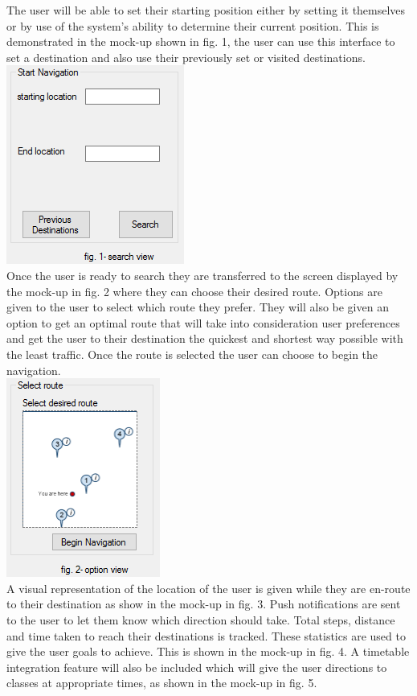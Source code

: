 \documentclass[a4paper,12pt]{article}
\begin{document}
The user will be able to set their starting position either by setting it themselves or by use of the system's ability to determine their current position. This is demonstrated in the mock-up shown in fig. 1, the user can use this interface to set a destination and also use their previously set or visited destinations. \\
\includegraphics[scale=1]{images/user_one.PNG}\\
Once the user is ready to search they are transferred to the screen displayed by the mock-up in fig. 2 where they can choose their desired route. Options are given to the user to select which route they prefer. They will also be given an option to get an optimal route that will  take into consideration user preferences and get the user to their destination the quickest and shortest way possible with the least traffic. Once the route is selected the user can choose to begin the navigation.\\
\includegraphics[scale=1]{images/user_two.PNG}\\
A visual representation of the location of the user is given while they are en-route to their destination as show in the mock-up in fig. 3. Push notifications are sent to the user to let them know which direction should take. Total steps, distance and time taken to reach their destinations is tracked. These statistics are used to give the user goals to achieve. This is shown in the mock-up in fig. 4. A timetable integration feature will also be included which will give the user directions to classes at appropriate times, as shown in the mock-up in fig. 5. \\
\end{document}
